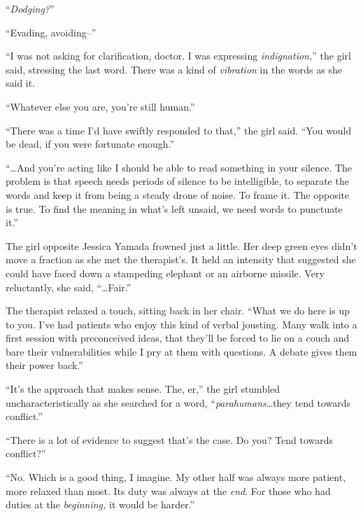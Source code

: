 ``\emph{Dodging?}''



``Evading, avoiding--''



``I was not asking for clarification, doctor.  I was expressing \emph{indignation,}'' the girl said, stressing the last word.  There was a kind of \emph{vibration} in the words as she said it.



``Whatever else you are, you're still human.''



``There was a time I'd have swiftly responded to that,'' the girl said.  ``You would be dead, if you were fortunate enough.''



``\ldots{}And you're acting like I should be able to read something in your silence.  The problem is that speech needs periods of silence to be intelligible, to separate the words and keep it from being a steady drone of noise.  To frame it.  The opposite is true.  To find the meaning in what's left unsaid, we need words to punctuate it.''



The girl opposite Jessica Yamada frowned just a little.  Her deep green eyes didn't move a fraction as she met the therapist's.  It held an intensity that suggested she could have faced down a stampeding elephant or an airborne missile.  Very reluctantly, she said, ``\ldots{}Fair.''



The therapist relaxed a touch, sitting back in her chair.  ``What we do here is up to you.  I've had patients who enjoy this kind of verbal jousting.  Many walk into a first session with preconceived ideas, that they'll be forced to lie on a couch and bare their vulnerabilities while I pry at them with questions.  A debate gives them their power back.''



``It's the approach that makes sense.  The, er,'' the girl stumbled uncharacteristically as she searched for a word, ``\emph{parahumans}\ldots they tend towards conflict.''



``There is a lot of evidence to suggest that's the case.  Do you?  Tend towards conflict?''



``No.  Which is a good thing, I imagine.  My other half was always more patient, more relaxed than most.  Its duty was always at the \emph{end}.  For those who had duties at the \emph{beginning, }it would be harder.''



